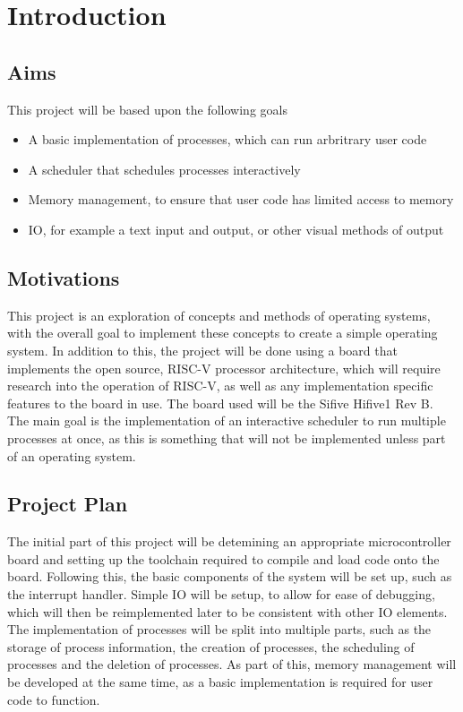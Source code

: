 \chapter{Introduction}
\label{cha:intro}
\section{Aims}
This project will be based upon the following goals
\begin{itemize}
    \item A basic implementation of processes, which can run arbritrary user code
    \item A scheduler that schedules processes interactively
    \item Memory management, to ensure that user code has limited access to memory
    \item IO, for example a text input and output, or other visual methods of output
\end{itemize}
\section{Motivations}
This project is an exploration of concepts and methods of operating systems, with the overall goal to implement these concepts to create a simple operating system. 
In addition to this, the project will be done using a board that implements the open source, RISC-V processor architecture, which will require research into the operation of RISC-V, as well as any implementation specific features to the board in use. The board used will be the Sifive Hifive1 Rev B.
The main goal is the implementation of an interactive scheduler to run multiple processes at once, as this is something that will not be implemented unless part of an operating system.

\section{Project Plan}
The initial part of this project will be detemining an appropriate microcontroller board and setting up the toolchain required to compile and load code onto the board. Following this, the basic components of the system will be set up, such as the interrupt handler. Simple IO will be setup, to allow for ease of debugging, which will then be reimplemented later to be consistent with other IO elements. The implementation of processes will be split into multiple parts, such as the storage of process information, the creation of processes, the scheduling of processes and the deletion of processes. As part of this, memory management will be developed at the same time, as a basic implementation is required for user code to function.

